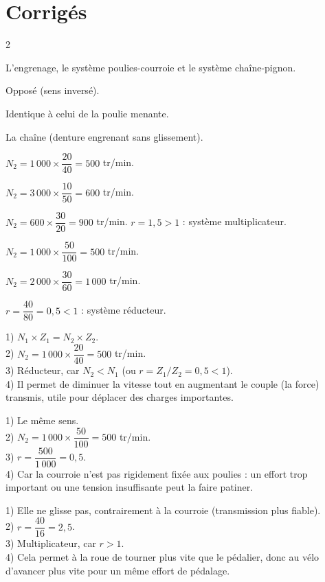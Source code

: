 \section{Corrigés}
\begin{multicols}{2}

L'engrenage, le système poulies-courroie et le système chaîne-pignon.

Opposé (sens inversé).

Identique à celui de la poulie menante.

La chaîne (denture engrenant sans glissement).

$N_2=1\,000\times\dfrac{20}{40}=500$ tr/min.

$N_2=3\,000\times\dfrac{10}{50}=600$ tr/min.

$N_2=600\times\dfrac{30}{20}=900$ tr/min. $r=1{,}5>1$ : système multiplicateur.

$N_2=1\,000\times\dfrac{50}{100}=500$ tr/min.

$N_2=2\,000\times\dfrac{30}{60}=1\,000$ tr/min.

$r=\dfrac{40}{80}=0{,}5<1$ : système réducteur.

1) $N_1\times Z_1=N_2\times Z_2$.\\
2) $N_2=1\,000\times\dfrac{20}{40}=500$ tr/min.\\
3) Réducteur, car $N_2<N_1$ (ou $r=Z_1/Z_2=0{,}5<1$).\\
4) Il permet de diminuer la vitesse tout en augmentant le couple (la force) transmis,
utile pour déplacer des charges importantes.

1) Le même sens.\\
2) $N_2=1\,000\times\dfrac{50}{100}=500$ tr/min.\\
3) $r=\dfrac{500}{1\,000}=0{,}5$.\\
4) Car la courroie n'est pas rigidement fixée aux poulies : un effort trop important ou
une tension insuffisante peut la faire patiner.

1) Elle ne glisse pas, contrairement à la courroie (transmission plus fiable).\\
2) $r=\dfrac{40}{16}=2{,}5$.\\
3) Multiplicateur, car $r>1$.\\
4) Cela permet à la roue de tourner plus vite que le pédalier, donc au vélo d'avancer
plus vite pour un même effort de pédalage.

\end{multicols}
\exercicesBanner
